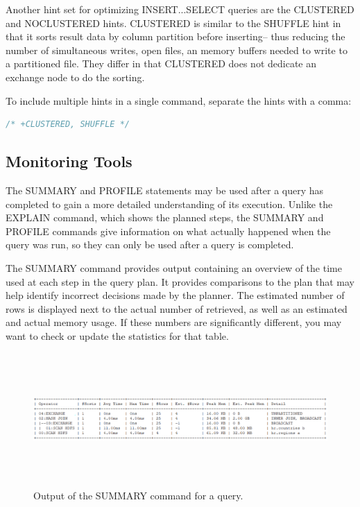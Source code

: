 \documentclass[onecolumn, draftclsnofoot,10pt, compsoc]{IEEEtran}
\begin{document}
Another hint set for optimizing INSERT...SELECT queries are the CLUSTERED and NOCLUSTERED hints. 
CLUSTERED is similar to the SHUFFLE hint in that it sorts result data by column partition before inserting-- thus reducing the number of simultaneous writes, open files, an memory buffers needed to write to a partitioned file.
They differ in that CLUSTERED does not dedicate an exchange node to do the sorting. 

To include multiple hints in a single command, separate the hints with a comma:

    \begin{center}
    \begin{lstlisting}[language=SQL]
/* +CLUSTERED, SHUFFLE */ 
\end{lstlisting}
\end{center}

\subsection{Monitoring Tools}
The SUMMARY and PROFILE statements may be used after a query has completed to gain a more detailed understanding of its execution.
Unlike the EXPLAIN command, which shows the planned steps, the SUMMARY and PROFILE commands give information on what actually happened when the query was run, so they can only be used after a query is completed.

The SUMMARY command provides output containing an overview of the time used at each step in the query plan.
It provides comparisons to the plan that may help identify incorrect decisions made by the planner.
The estimated number of rows is displayed next to the actual number of retrieved, as well as an estimated and actual memory usage.
If these numbers are significantly different, you may want to check or update the statistics for that table.

\begin{figure}[ht]
    \begin{center}
    \includegraphics[height=2in, keepaspectratio]{summary.eps}
    \caption{Output of the SUMMARY command for a query.}
    \end{center}
\end{figure}
\end{document}
